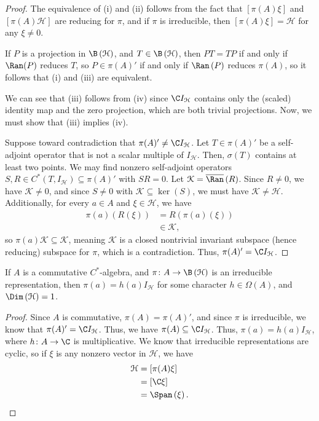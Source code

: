 \documentclass[10pt]{mypackage}
\begin{document}
\begin{proof}
  The equivalence of (i) and (ii) follows from the fact that $\left[\pi(A)\xi\right]$ and $\left[\pi(A)\mathcal{H}\right]$ are reducing for $\pi$, and if $\pi$ is irreducible, then $\left[\pi(A)\xi\right] = \mathcal{H}$ for any $\xi\neq 0$.\newline

  If $P$ is a projection in $\B\left(\mathcal{H}\right)$, and $T\in \B\left(\mathcal{H}\right)$, then $PT = TP$ if and only if $\Ran(P)$ reduces $T$, so $P\in \pi(A)'$ if and only if $\Ran\left(P\right)$ reduces $\pi(A)$, so it follows that (i) and (iii) are equivalent.\newline

  We can see that (iii) follows from (iv) since $\C I_{\mathcal{H}}$ contains only the (scaled) identity map and the zero projection, which are both trivial projections. Now, we must show that (iii) implies (iv).\newline

  Suppose toward contradiction that $\pi(A)' \neq \C I_{\mathcal{H}}$. Let $T\in \pi(A)'$ be a self-adjoint operator that is not a scalar multiple of $I_{\mathcal{H}}$. Then, $\sigma(T)$ contains at least two points. We may find nonzero self-adjoint operators $S,R\in C^{\ast}\left(T,I_{\mathcal{H}}\right)\subseteq \pi(A)'$ with $SR = 0$. Let $\mathcal{K} = \overline{\Ran}\left(R\right)$. Since $R \neq 0$, we have $\mathcal{K}\neq 0$, and since $S\neq 0$ with $\mathcal{K}\subseteq \ker\left(S\right)$, we must have $\mathcal{K}\neq \mathcal{H}$. Additionally, for every $a\in A$ and $\xi\in \mathcal{H}$, we have
  \begin{align*}
    \pi(a)\left(R\left(\xi\right)\right) &= R\left(\pi(a)\left(\xi\right)\right)\\
                                         &\in \mathcal{K},
  \end{align*}
  so $\pi(a)\mathcal{K}\subseteq \mathcal{K}$, meaning $\mathcal{K}$ is a closed nontrivial invariant subspace (hence reducing) subspace for $\pi$, which is a contradiction. Thus, $\pi(A)' = \C I_{\mathcal{H}}$.
\end{proof}
\begin{corollary}
  If $A$ is a commutative $C^{\ast}$-algebra, and $\pi\colon A\rightarrow \B\left(\mathcal{H}\right)$ is an irreducible representation, then $\pi(a) = h(a)I_{\mathcal{H}}$ for some character $h\in \Omega\left(A\right)$, and $\Dim\left(\mathcal{H}\right) = 1$.
\end{corollary}
\begin{proof}
  Since $A$ is commutative, $\pi(A) = \pi(A)'$, and since $\pi$ is irreducible, we know that $\pi(A)' = \C I_{\mathcal{H}}$. Thus, we have $\pi(A) \subseteq \C I_{\mathcal{H}}$. Thus, $\pi(a) = h(a) I_{\mathcal{H}}$, where $h\colon A\rightarrow \C$ is multiplicative. We know that irreducible representations are cyclic, so if $\xi$ is any nonzero vector in $\mathcal{H}$, we have
  \begin{align*}
    \mathcal{H} &= \left[\pi(A)\xi\right]\\
                &= \left[\C\xi\right]\\
                &= \Span\left(\xi\right).
  \end{align*}
\end{proof}
\end{document}
